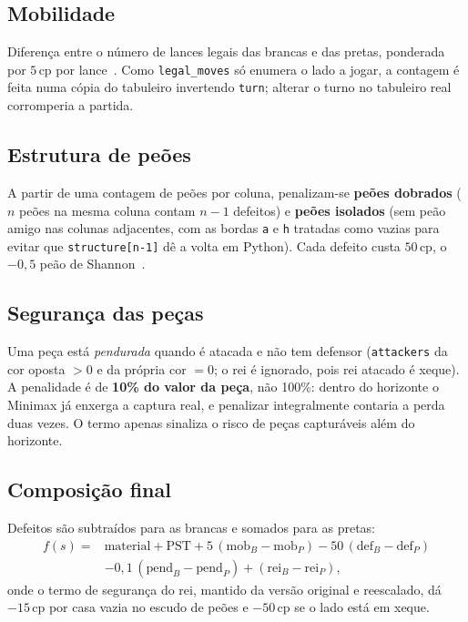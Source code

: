 \documentclass[12pt,a4paper]{article}
\newcommand{\cp}{\,\text{cp}}
\begin{document}
\subsection{Mobilidade}

Diferença entre o número de lances legais das brancas e das pretas,
ponderada por $5\cp$ por lance~\cite{cpw-mobility}. Como
\texttt{legal\_moves} só enumera o lado a jogar, a contagem é feita numa
cópia do tabuleiro invertendo \texttt{turn}; alterar o turno no
tabuleiro real corromperia a partida.

\subsection{Estrutura de peões}

A partir de uma contagem de peões por coluna, penalizam-se
\textbf{peões dobrados} ($n$ peões na mesma coluna contam $n-1$
defeitos) e \textbf{peões isolados} (sem peão amigo nas colunas
adjacentes, com as bordas \texttt{a} e \texttt{h} tratadas como vazias
para evitar que \texttt{structure[n-1]} dê a volta em Python). Cada
defeito custa $50\cp$, o $-0{,}5$ peão de Shannon~\cite{cpw-pawn}.

\subsection{Segurança das peças}

Uma peça está \emph{pendurada} quando é atacada e não tem defensor
(\texttt{attackers} da cor oposta $>0$ e da própria cor $=0$; o rei é
ignorado, pois rei atacado é xeque). A penalidade é de \textbf{10\% do
valor da peça}, não 100\%: dentro do horizonte o Minimax já enxerga a
captura real, e penalizar integralmente contaria a perda duas vezes. O
termo apenas sinaliza o risco de peças capturáveis além do horizonte.

\subsection{Composição final}

Defeitos são subtraídos para as brancas e somados para as pretas:
\begin{align*}
  f(s) ={}& \text{material} + \text{PST}
          + 5\,(\text{mob}_B - \text{mob}_P)
          - 50\,(\text{def}_B - \text{def}_P) \\
        & - 0{,}1\,(\text{pend}_B - \text{pend}_P)
          + (\text{rei}_B - \text{rei}_P),
\end{align*}
onde o termo de segurança do rei, mantido da versão original e
reescalado, dá $-15\cp$ por casa vazia no escudo de peões e $-50\cp$ se
o lado está em xeque.
\end{document}
